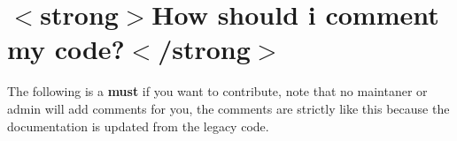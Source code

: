 \chapter{\texorpdfstring{$<$}{<}strong\texorpdfstring{$>$}{>}How should i comment my code?\texorpdfstring{$<$}{<}/strong\texorpdfstring{$>$}{>}}
\hypertarget{md__2_users_2spirosmag_2_documents_2_algo_plus_2_c_o_m_m_e_n_t_s}{}\label{md__2_users_2spirosmag_2_documents_2_algo_plus_2_c_o_m_m_e_n_t_s}
\label{md__2_users_2spirosmag_2_documents_2_algo_plus_2_c_o_m_m_e_n_t_s_autotoc_md0}%
%
 The following is a {\bfseries{must}} if you want to contribute, note that no maintaner or admin will add comments for you, the comments are strictly like this because the documentation is updated from the legacy code.


\begin{DoxyCode}{0}
\DoxyCodeLine{}
\DoxyCodeLine{\}}

\end{DoxyCode}



\begin{DoxyCode}{0}
\DoxyCodeLine{}
\DoxyCodeLine{\}}

\end{DoxyCode}
 